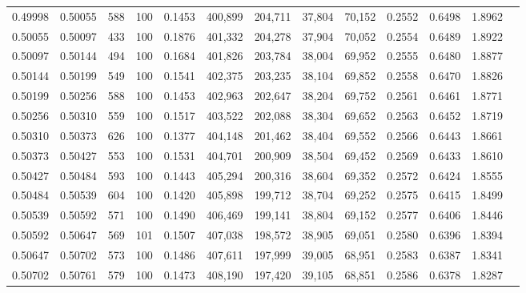 \begin{tabular}{rrrrrrrrrrrrr}
0.49998 & 0.50055 &   588 & 100 &                                     0.1453 & 400,899 & 204,711 &  37,804 &  70,152 & 0.2552 & 0.6498 & 1.8962 \\
0.50055 & 0.50097 &   433 & 100 &                                     0.1876 & 401,332 & 204,278 &  37,904 &  70,052 & 0.2554 & 0.6489 & 1.8922 \\
0.50097 & 0.50144 &   494 & 100 &                                     0.1684 & 401,826 & 203,784 &  38,004 &  69,952 & 0.2555 & 0.6480 & 1.8877 \\
0.50144 & 0.50199 &   549 & 100 &                                     0.1541 & 402,375 & 203,235 &  38,104 &  69,852 & 0.2558 & 0.6470 & 1.8826 \\
0.50199 & 0.50256 &   588 & 100 &                                     0.1453 & 402,963 & 202,647 &  38,204 &  69,752 & 0.2561 & 0.6461 & 1.8771 \\
0.50256 & 0.50310 &   559 & 100 &                                     0.1517 & 403,522 & 202,088 &  38,304 &  69,652 & 0.2563 & 0.6452 & 1.8719 \\
0.50310 & 0.50373 &   626 & 100 &                                     0.1377 & 404,148 & 201,462 &  38,404 &  69,552 & 0.2566 & 0.6443 & 1.8661 \\
0.50373 & 0.50427 &   553 & 100 &                                     0.1531 & 404,701 & 200,909 &  38,504 &  69,452 & 0.2569 & 0.6433 & 1.8610 \\
0.50427 & 0.50484 &   593 & 100 &                                     0.1443 & 405,294 & 200,316 &  38,604 &  69,352 & 0.2572 & 0.6424 & 1.8555 \\
0.50484 & 0.50539 &   604 & 100 &                                     0.1420 & 405,898 & 199,712 &  38,704 &  69,252 & 0.2575 & 0.6415 & 1.8499 \\
0.50539 & 0.50592 &   571 & 100 &                                     0.1490 & 406,469 & 199,141 &  38,804 &  69,152 & 0.2577 & 0.6406 & 1.8446 \\
0.50592 & 0.50647 &   569 & 101 &                                     0.1507 & 407,038 & 198,572 &  38,905 &  69,051 & 0.2580 & 0.6396 & 1.8394 \\
0.50647 & 0.50702 &   573 & 100 &                                     0.1486 & 407,611 & 197,999 &  39,005 &  68,951 & 0.2583 & 0.6387 & 1.8341 \\
0.50702 & 0.50761 &   579 & 100 &                                     0.1473 & 408,190 & 197,420 &  39,105 &  68,851 & 0.2586 & 0.6378 & 1.8287 \\

\end{tabular}

